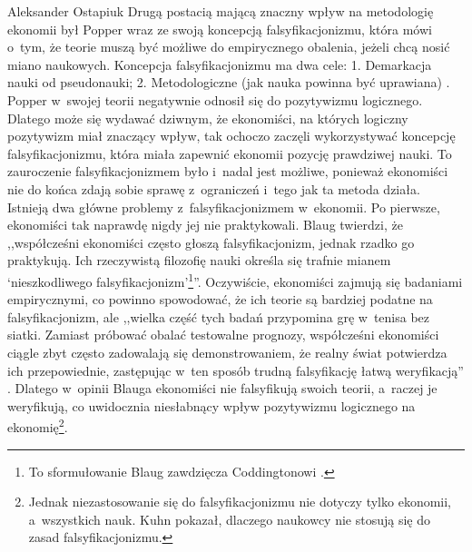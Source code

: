 \begin{artplenv}{Aleksander Ostapiuk}
Drugą postacią mającą znaczny wpływ na metodologię ekonomii był Popper wraz ze swoją koncepcją falsyfikacjonizmu, która
mówi o~tym, że teorie muszą być możliwe do empirycznego obalenia, jeżeli chcą nosić miano naukowych. Koncepcja
falsyfikacjonizmu ma dwa cele: 1. Demarkacja nauki od pseudonauki; 2. Metodologiczne (jak nauka powinna być uprawiana)
\parencite{hands_popper_1993}.
Popper w~swojej teorii negatywnie odnosił się do pozytywizmu logicznego.
Dlatego może się wydawać dziwnym, że ekonomiści, na których logiczny pozytywizm miał znaczący wpływ, tak ochoczo zaczęli
wykorzystywać koncepcję falsyfikacjonizmu, która miała zapewnić ekonomii pozycję prawdziwej nauki. To zauroczenie
falsyfikacjonizmem było i~nadal jest możliwe, ponieważ ekonomiści nie do końca zdają sobie sprawę z~ograniczeń i~tego
jak ta metoda działa. Istnieją dwa główne problemy z~falsyfikacjonizmem w~ekonomii. Po pierwsze, ekonomiści tak naprawdę
nigdy jej nie praktykowali. Blaug
\parencite*[s.~175]{blaug_metodologia_1995}
twierdzi, że ,,współcześni ekonomiści często
głoszą falsyfikacjonizm, jednak rzadko go praktykują. Ich rzeczywistą filozofię nauki określa się trafnie mianem
`nieszkodliwego falsyfikacjonizm'\footnote{To sformułowanie Blaug zawdzięcza Coddingtonowi
\parencite[s.~542]{coddington_rationale_1975}.
}''.
Oczywiście, ekonomiści zajmują się badaniami empirycznymi, co powinno
spowodować, że ich teorie są bardziej podatne na falsyfikacjonizm, ale ,,wielka część tych badań przypomina grę w~tenisa
bez siatki. Zamiast próbować obalać testowalne prognozy, współcześni ekonomiści ciągle zbyt często zadowalają się
demonstrowaniem, że realny świat potwierdza ich przepowiednie, zastępując w~ten sposób trudną falsyfikację łatwą
weryfikacją''
\parencite[s.~348]{blaug_metodologia_1995}.
Dlatego w~opinii Blauga ekonomiści nie falsyfikują swoich
teorii, a~raczej je weryfikują, co uwidocznia niesłabnący wpływ pozytywizmu logicznego na ekonomię\footnote{Jednak
niezastosowanie się do falsyfikacjonizmu nie dotyczy tylko ekonomii, a~wszystkich nauk. Kuhn
\parencite*{kuhn_structure_1962}
pokazał, dlaczego naukowcy nie stosują się do zasad falsyfikacjonizmu.}. 


\end{artplenv}
